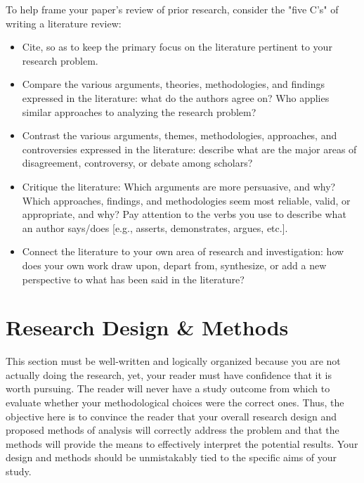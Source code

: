 \documentclass[10pt,twocolumn,letterpaper]{article}
\begin{document}
To help frame your paper's review of prior research, consider the "five C’s" of writing a literature review:
\begin{itemize}
    \item Cite, so as to keep the primary focus on the literature pertinent to your research problem.
    \item Compare the various arguments, theories, methodologies, and findings expressed in the literature: what do the authors agree on? Who applies similar approaches to analyzing the research problem?
    \item Contrast the various arguments, themes, methodologies, approaches, and controversies expressed in the literature: describe what are the major areas of disagreement, controversy, or debate among scholars?
    \item Critique the literature: Which arguments are more persuasive, and why? Which approaches, findings, and methodologies seem most reliable, valid, or appropriate, and why? Pay attention to the verbs you use to describe what an author says/does [e.g., asserts, demonstrates, argues, etc.].
    \item Connect the literature to your own area of research and investigation: how does your own work draw upon, depart from, synthesize, or add a new perspective to what has been said in the literature?
\end{itemize}


\section{Research Design \& Methods}
This section must be well-written and logically organized because you are not actually doing the research, yet, your reader must have confidence that it is worth pursuing. The reader will never have a study outcome from which to evaluate whether your methodological choices were the correct ones. Thus, the objective here is to convince the reader that your overall research design and proposed methods of analysis will correctly address the problem and that the methods will provide the means to effectively interpret the potential results. Your design and methods should be unmistakably tied to the specific aims of your study.
\end{document}
